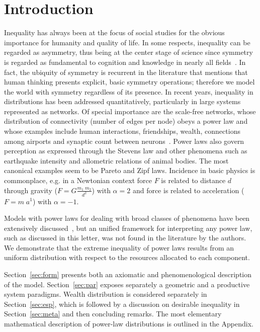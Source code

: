 \documentclass[a4paper, 11pt]{article} %
\begin{document}
\section{Introduction}
Inequality has always been at the focus of social studies for the obvious importance for humanity and quality of life.
In some respects, inequality can be regarded as asymmetry, thus being at the center stage of science since symmetry is regarded as fundamental to cognition and knowledge in nearly all fields~\cite{deleuze,part}.
In fact, the ubiquity of symmetry is recurrent in the literature that mentions that human thinking presents explicit, basic symmetry operations; therefore we model the world with symmetry regardless of its presence.
In recent years, inequality in distributions has been addressed quantitatively, particularly in large systems represented as networks.
Of special importance are the scale-free networks, whose distribution of connectivity (number of edges per node) obeys a power law
and whose
examples include human interactions, friendships, wealth, 
connections among airports and synaptic count between neurons~\cite{newman}.
Power laws also govern perception as expressed through the Stevens law
and other phenomena such as
earthquake intensity and allometric relations of animal bodies.
The most canonical examples seem to be Pareto and Zipf laws.
Incidence in basic physics is commonplace, e.g. in a Newtonian context force $F$ is related to distance $d$ through gravity
($F=G\frac{m_1\;m_2}{d^2}$)
with $\alpha=2$ 
and force is related to acceleration
($F=m\;a^1$) 
with $\alpha=-1$.

Models with power laws for dealing with broad classes of phenomena have been extensively discussed~\cite{part,pbook},
but an unified framework for interpreting any power law, such as discussed in this letter, was not found in the literature by the authors.
We demonstrate that the extreme inequality of power laws results from an uniform distribution with respect to the resources allocated to each component.

Section~\ref{sec:form} presents both an axiomatic and phenomenological
description of the model.
Section~\ref{sec:par} exposes separately a geometric and a productive system
paradigms.
Wealth distribution is considered separately in Section~\ref{sec:esp},
which is followed by a discussion on desirable inequality in Section~\ref{sec:meta} and then concluding remarks.
The most elementary mathematical description 
of power-law distributions is outlined in the
Appendix.
\end{document}
